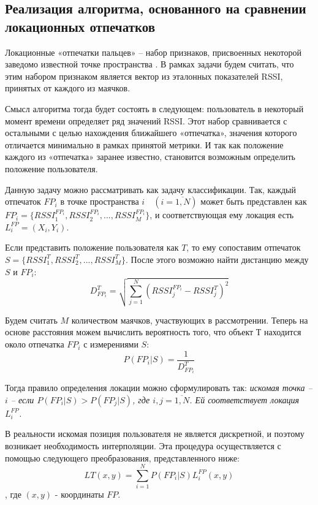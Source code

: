 \subsection{Реализация алгоритма, основанного на сравнении локационных отпечатков}

Локационные «отпечатки пальцев» – набор признаков, присвоенных некоторой заведомо известной точке пространства \cite{elbes2013precise}.  В рамках задачи будем считать, что этим набором признаком является вектор из эталонных показателей RSSI, принятых от каждого из маячков.

Смысл алгоритма тогда будет состоять в следующем: пользователь в некоторый момент времени определяет ряд значений RSSI. Этот набор сравнивается с остальными с целью нахождения ближайшего «отпечатка», значения которого отличается минимально в рамках принятой метрики. И так как положение каждого из «отпечатка» заранее известно, становится возможным определить положение пользователя.

Данную задачу можно рассматривать как задачу классификации. Так, каждый отпечаток $FP_i$ в точке пространства $i \quad (i=\overline{1,N})$ может быть представлен как $FP_i = \{ RSSI_1^{FP_i}, RSSI_2^{FP_i}, ..., RSSI_M^{FP_i} \}$, и соответствующая ему локация есть $L_i^{FP} = (X_i, Y_i)$.

Если представить положение пользователя как $T$, то ему сопоставим отпечаток $ S = \{ RSSI_1^T, RSSI_2^T, ..., RSSI_M^T \}$. После этого возможно найти дистанцию между $S$ и $FP_i$:
\begin{equation} \label{for:D}
    D^T_{FP_i} = \sqrt{ \sum_{j=1}^N ( RSSI_j^{FP_i} - RSSI_j^T )^2 }
\end{equation}

Будем считать $M$ количеством маячков, участвующих в рассмотрении. Теперь на основе расстояния можем вычислить вероятность того, что объект $Т$ находится около отпечатка $FP_i$ с измерениями $S$:
\begin{equation} \label{for:Prob}
    P(FP_i | S) = \frac{1}{ D^T_{FP_i} }
\end{equation}

Тогда правило определения локации можно сформулировать так: \textit{искомая точка – $i$ – если $P(FP_i | S) > P(FP_j | S)$, где $i,j = \overline{1,N}$. Ей соответствует локация $L_i^{FP}$.}

В реальности искомая позиция пользователя не является дискретной, и поэтому возникает необходимость интерполяции. Эта процедура осуществляется с помощью следующего преобразования, представленного ниже:
\[
    LT(x,y) = \sum_{i=1}^N P(FP_i | S) L_i^{FP}(x,y)
\]
, где $(x,y)$ - координаты $FP$.

